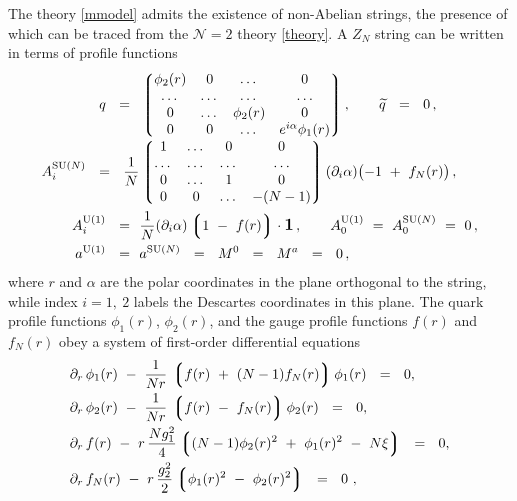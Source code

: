 \documentclass[12pt]{article}
\newcommand{\ntwo}{${\mathcal N}=2$ }
\newcommand{\p}{\partial}
\newcommand{\wt}{\widetilde}
\newcommand{\lgr}{\left\lgroup}
\newcommand{\rgr}{\right\rgroup}
\newcommand{\aU}{a^{\rm U(1)}}
\newcommand{\aN}{a^\text{SU($N$)}}
\begin{document}
	The theory \eqref{mmodel} admits the existence of non-Abelian strings, the presence of which can be traced
	from the \ntwo theory \eqref{theory}.
	A $ Z_N $ string can be written in terms of profile functions \cite{ABEKY,GSYmmodel}
\begin{align}
%
\notag
	q   ~~=~~  &
		\lgr \begin{matrix}
			\phi_2(r) & 0     & \dots      & 0      \\
			\dots     & \dots & \dots      & \dots  \\
			0         & \dots & \phi_2(r)  & 0      \\
			0         &  0    & \dots      & e^{i\alpha}\phi_1(r) 
		     \end{matrix} \rgr ,
		\qquad \wt{q} ~~=~~ 0\,,
	\\
%
\label{znstr}
	\\[-0.7cm]
%
\notag
	A_i^\text{SU($N$)}  ~~=~~
		\frac{1}{N} & \lgr \begin{matrix}
        			    	1       &   \dots   &  0       &   0   \\
        				\dots   &   \dots   &  \dots   & \dots \\
        				0       &   \dots   &  1       &   0   \\
        				0       &     0     &  \dots   & - (N-1) 
	   		         \end{matrix} \rgr
		(\p_i\alpha)\bigl( -1 ~+~ f_{N}(r) \bigr)\,,
	\\
%
\notag
	A_i^{\rm U(1)}  ~~=~~ & \frac{1}{N}(\p_i\alpha)\lgr 1 ~-~ f(r) \rgr \cdot \mathlarger{\mathbf{1}}\,,
	\qquad 
	A_0^{\rm U(1)} ~=~ A_0^\text{SU($N$)} ~=~ 0\,,
	\\
%
\notag
	\aU ~~=~~ & \aN ~~=~~ M^0 ~~=~~ M^a ~~=~~ 0\,,
\end{align}
	where $ r $ and $ \alpha $ are the polar coordinates in the plane orthogonal to the string, while 
	index $ i = 1,~ 2 $ labels the Descartes coordinates in this plane.
	The quark profile functions $ \phi_1(r) $, $ \phi_2(r) $, and the gauge profile functions 
	$ f(r) $ and $ f_N(r) $ obey a system of first-order differential equations
\begin{align}
%
\notag
&	\p_r\, \phi_1(r) ~-~ \frac{1}{Nr}\, \lgr f(r) ~+~ (N-1)f_{N}(r) \rgr \phi_1(r) ~~=~~ 0, \\
%
\notag
&	\p_r\, \phi_2(r) ~-~ \frac{1}{Nr}\, \lgr f(r) ~-~ f_{N}(r) \rgr \phi_2(r) ~~=~~ 0 ,\\
%
\label{foes}
&	\p_r\, f(r) ~-~ r\, \frac{N g_1^2}{4} \lgr (N-1)\phi_2(r)^2 ~+~ \phi_1(r)^2 ~-~ N\xi \rgr ~~=~~ 0 , \\
%
\notag
&	\p_r\, f_{N}(r)  ~-~  r\, \frac{g_2^2}{2} \lgr \phi_1(r)^2 ~-~ \phi_2(r)^2 \rgr ~~=~~ 0~,
\end{align}
\end{document}
